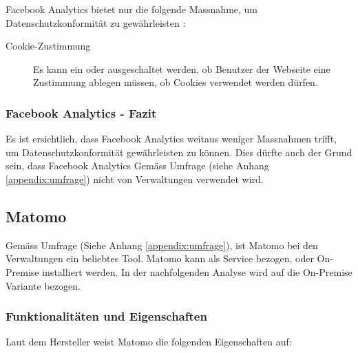 Facebook Analytics bietet nur die folgende Massnahme, um Datenschutzkonformität zu gewährleisten \parencite{facebookAnalyticsGDPR}: 

\begin{description}
  \item[Cookie-Zustimmung] Es kann ein oder ausgeschaltet werden, ob Benutzer der Webseite eine Zustimmung ablegen müssen, ob Cookies verwendet werden dürfen.
\end{description}

\subsubsection{Facebook Analytics - Fazit}
Es ist ersichtlich, dass Facebook Analytics weitaus weniger Massnahmen trifft, um Datenschutzkonformität gewährleisten zu können. Dies dürfte auch der Grund sein, dass Facebook Analytics Gemäss Umfrage (siehe Anhang \ref{appendix:umfrage}) nicht von Verwaltungen verwendet wird.

\subsection{Matomo}

Gemäss Umfrage (Siehe Anhang \ref{appendix:umfrage}), ist Matomo bei den Verwaltungen ein beliebtes Tool. Matomo kann als Service bezogen, oder On-Premise installiert werden. In der nachfolgenden Analyse wird auf die On-Premise Variante bezogen.

\subsubsection{Funktionalitäten und Eigenschaften}
Laut dem Hersteller weist Matomo die folgenden Eigenschaften auf:

